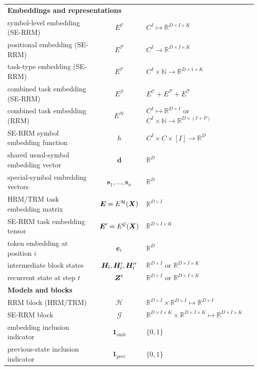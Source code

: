 \documentclass{article}
\theoremstyle{plain}
\theoremstyle{definition}
\theoremstyle{remark}
\begin{document}
\begin{table}[H]
{\begin{tabular}{l c l}
\midrule
\multicolumn{3}{l}{\textbf{Embeddings and representations}} \\
symbol-level embedding (SE-RRM) & $E^{\mathcal C}$ & $C^I \mapsto \mathbb{R}^{D \times I \times K}$ \\
positional embedding (SE-RRM) & $E^{\mathcal P}$ & $C^I \to \mathbb{R}^{D \times I \times K}$ \\
task-type embedding (SE-RRM) & $E^{\mathcal T}$ & $C^I \times \mathbb{N} \rightarrow \mathbb{R}^{D \times 1 \times K}$\\
combined task embedding (SE-RRM) & $E^{\mathcal G}$ & $E^{\mathcal C} + E^{\mathcal P} + E^{\mathcal T}$ \\
combined task embedding (RRM) & $E^{\mathcal H}$ & $C^I \mapsto \mathbb{R}^{D \times I}$ or $C^I \times \mathbb{N} \rightarrow \mathbb{R}^{D \times (I+P)}$ \\
SE-RRM symbol embedding function & $h$ & $C^I \times C \times [I] \rightarrow \mathbb{R}^D$ \\
shared usual-symbol embedding vector & $\mathbf{d}$ & $\mathbb{R}^D$ \\
special-symbol embedding vectors & $\mathbf{s}_1, \ldots, \mathbf{s}_n$ & $\mathbb{R}^D$ \\

HRM/TRM task embedding matrix & $\bm{E}=E^{\mathcal H}(\bm{X})$ & $\mathbb{R}^{D \times I}$ \\
SE-RRM task embedding tensor & $\bm{E}'=E^{\mathcal G}(\bm{X})$ & $\mathbb{R}^{D \times I \times K}$ \\
token embedding at position $i$ & $\bm{e}_i$ & $\mathbb{R}^{D}$ \\
intermediate block states & $\bm{H}_l, \bm{H}'_l,\bm{H}_l''$ &   $\mathbb{R}^{D \times I}$ or $\mathbb{R}^{D \times I \times K}$\\
recurrent state at step $t$ & $\bm{Z}^t$ & $\mathbb{R}^{D \times I}$ or $\mathbb{R}^{D \times I \times K}$ \\

\midrule
\multicolumn{3}{l}{\textbf{Models and blocks}} \\
RRM block (HRM/TRM) & $\mathcal H$ & $\mathbb{R}^{D \times I} \times \mathbb{R}^{D \times I} \mapsto \mathbb{R}^{D \times I}$ \\
SE-RRM block & $\mathcal G$ & $\mathbb{R}^{D \times I \times K} \times \mathbb{R}^{D \times I \times K} \mapsto \mathbb{R}^{D \times I \times K}$ \\
embedding inclusion indicator & $\mathbf{1}_{\text{emb}}$ & $\{0, 1\}$ \\
previous-state inclusion indicator & $\mathbf{1}_{\text{prev}}$ & $\{0, 1\}$ \\


\end{tabular}}
\end{table}
\end{document}
